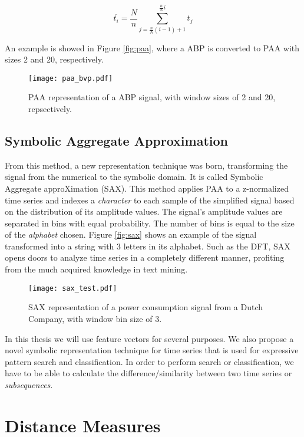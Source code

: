 \begin{equation}
\overline{t_i} = \frac{N}{n} \sum^{\frac{n}{N}i}_{j=\frac{n}{N}(i-1)+1} t_j
\end{equation}

An example is showed in Figure \ref{fig:paa}, where a \gls{ABP} is converted to \gls{PAA} with sizes 2 and 20, respectively.

    
\begin{figure}
\centering
\texttt{[image: paa\_bvp.pdf]}
\label{fig:paa_intro}
\caption{PAA representation of a \gls{ABP} signal, with window sizes of 2 and 20, repsectively.}
\end{figure}
    

\subsection{Symbolic Aggregate Approximation}
\label{subsec:sax}

From this method, a new representation technique was born, transforming the signal from the numerical to the symbolic domain. It is called Symbolic Aggregate approXimation (SAX). This method applies PAA to a z-normalized time series and indexes a \textit{character} to each sample of the simplified signal based on the distribution of its amplitude values. The signal's amplitude values are separated in bins with equal probability. The number of bins is equal to the size of the \textit{alphabet} chosen. Figure \ref{fig:sax} shows an example of the signal transformed into a string with 3 letters in its alphabet. Such as the DFT, SAX opens doors to analyze time series in a completely different manner, profiting from the much acquired knowledge in text mining.

\begin{figure}
\centering
\texttt{[image: sax\_test.pdf]}
\label{fig:paa_intro}
\caption{SAX representation of a power consumption signal from a Dutch Company, with window bin size of 3.}
\end{figure}

In this thesis we will use feature vectors for several purposes. We also propose a novel symbolic representation technique for time series that is used for expressive pattern search and classification. In order to perform search or classification, we have to be able to calculate the difference/similarity between two time series or \textit{subsequences}.

\section{Distance Measures}
\label{sec:distance}

